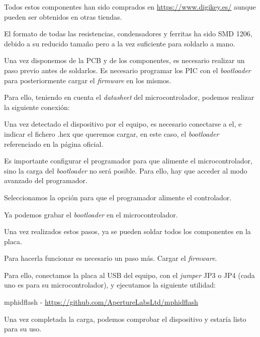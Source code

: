 Todos estos componentes han sido comprados en \url{https://www.digikey.es/} aunque pueden ser obtenidos en otras tiendas.

El formato de todas las resistencias, condensadores y ferritas ha sido SMD 1206, debido a su reducido tamaño pero a la vez suficiente para soldarlo a mano.

Una vez disponemos de la PCB y de los componentes, es necesario realizar un paso previo antes de soldarlos. Es necesario programar los PIC con el \emph{bootloader} para posteriormente cargar el \emph{firmware} en los mismos.

Para ello, teniendo en cuenta el \emph{datasheet} del microcontrolador, podemos realizar la siguiente conexión:






Una vez detectado el dispositivo por el equipo, es necesario conectarse a el, e indicar el fichero .hex que queremos cargar, en este caso, el \emph{bootloader} referenciado en la página oficial.

Es importante configurar el programador para que alimente el microcontrolador, sino la carga del \emph{bootloader} no será posible. Para ello, hay que acceder al modo avanzado del programador.


Seleccionamos la opción para que el programador alimente el controlador.

Ya podemos grabar el \emph{bootloader} en el microcontrolador.

Una vez realizados estos pasos, ya se pueden soldar todos los componentes en la placa.

Para hacerla funcionar es necesario un paso más. Cargar el \emph{firmware}.

Para ello, conectamos la placa al USB del equipo, con el \emph{jumper} JP3 o JP4 (cada uno es para su microcontrolador), y ejecutamos la siguiente utilidad:

mphidflash - \url{https://github.com/ApertureLabsLtd/mphidflash}



Una vez completada la carga, podemos comprobar el dispositivo y estaría listo para su uso.
